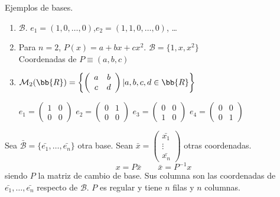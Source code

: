\begin{ejemplo} Ejemplos de bases.
\begin{enumerate}
    \item $\mathcal{B}$. $e_1 = (1, 0, \dots, 0)$,\quad $e_2 = (1, 1, 0, \dots, 0)$, \quad \dots

    \item Para $n=2$, $P(x) = a + bx + cx^2$. \quad $\mathcal{B} = \{1, x, x^2\}$\\Coordenadas de $P\equiv (a,b,c)$

    \item $\mathcal{M}_2(\bb{R}) = \left\{
        \left( \begin{array}{cc}
            a & b \\
            c & d
        \end{array}\right)
        | a, b, c, d \in \bb{R} \right\}$

        $e_1 = \left( \begin{array}{cc}
            1 & 0 \\
            0 & 0
        \end{array}\right)$ \quad
        $e_2 = \left( \begin{array}{cc}
            0 & 1 \\
            0 & 0
        \end{array}\right)$ \quad
        $e_3 = \left( \begin{array}{cc}
            0 & 0 \\
            1 & 0
        \end{array}\right)$ \quad
        $e_4 = \left( \begin{array}{cc}
            0 & 0 \\
            0 & 1
        \end{array}\right)$
\end{enumerate}
\end{ejemplo}

\begin{teo} 
    Sea $\bar{\mathcal{B}}=\{\bar{e_1}, \dots, \bar{e_n}\}$ otra base.
    Sean $\bar{x} = \left( \begin{array}{c}
             \bar{x_1}\\
             \vdots \\
             \bar{x_n}
        \end{array}\right)$ otras coordenadas.
    \begin{equation*}
        x = P\bar{x} \qquad \bar{x} = P^{-1}x
    \end{equation*}
    siendo $P$ la matriz de cambio de base. Sus columna son las coordenadas de $\bar{e_1}, \dots, \bar{e_n}$ respecto de $\mathcal{B}$. $P$ es regular y tiene $n$ filas y $n$ columnas.
\end{teo}

